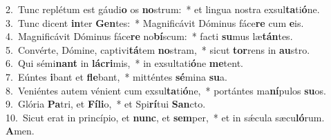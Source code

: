 {2.~}Tunc replétum est gáudi\textbf{o} os \textbf{no}strum:~* et lingua nostra exsul\textbf{ta}ti\textbf{ó}ne.\\
{3.~}Tunc dicent \textbf{in}ter \textbf{Gen}tes:~* Magnificávit Dóminus fáce\textbf{re} cum \textbf{e}is.\\
{4.~}Magnificávit Dóminus fáce\textbf{re} no\textbf{bí}scum:~* facti \textbf{su}mus læ\textbf{tán}tes.\\
{5.~}Convérte, Dómine, captivi\textbf{tá}tem \textbf{no}stram,~* sicut \textbf{tor}rens in \textbf{au}stro.\\
{6.~}Qui sémi\textbf{nant} in \textbf{lá}\textbf{cri}mis,~* in exsultati\textbf{ó}ne \textbf{me}tent.\\
{7.~}Eúntes \textbf{i}bant et \textbf{fle}bant,~* mitténtes \textbf{sé}mina \textbf{su}a.\\
{8.~}Veniéntes autem vénient cum exsul\textbf{ta}ti\textbf{ó}ne,~* portántes ma\textbf{ní}pulos \textbf{su}os.\\
{9.~}Glória \textbf{Pa}tri, et \textbf{Fí}\textbf{li}o,~* et Spi\textbf{rí}tui \textbf{San}cto.\\
{10.~}Sicut erat in princípio, et \textbf{nunc}, et \textbf{sem}per,~* et in sǽcula sæcu\textbf{ló}rum. \textbf{A}men.\\
